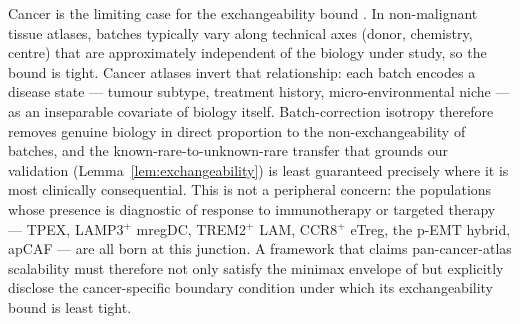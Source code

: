 
Cancer is the limiting case for the exchangeability bound . In non-malignant tissue atlases, batches typically vary along technical axes (donor, chemistry, centre) that are approximately independent of the biology under study, so the bound is tight. Cancer atlases invert that relationship: each batch encodes a disease state --- tumour subtype, treatment history, micro-environmental niche --- as an inseparable covariate of biology itself. Batch-correction isotropy therefore removes genuine biology in direct proportion to the non-exchangeability of batches, and the known-rare-to-unknown-rare transfer that grounds our validation (Lemma~\ref{lem:exchangeability}) is least guaranteed precisely where it is most clinically consequential. This is not a peripheral concern: the populations whose presence is diagnostic of response to immunotherapy or targeted therapy --- TPEX, LAMP3$^{+}$ mregDC, TREM2$^{+}$ LAM, CCR8$^{+}$ eTreg, the p-EMT hybrid, apCAF --- are all born at this junction. A framework that claims pan-cancer-atlas scalability must therefore not only satisfy the minimax envelope of  but explicitly disclose the cancer-specific boundary condition under which its exchangeability bound is least tight.
